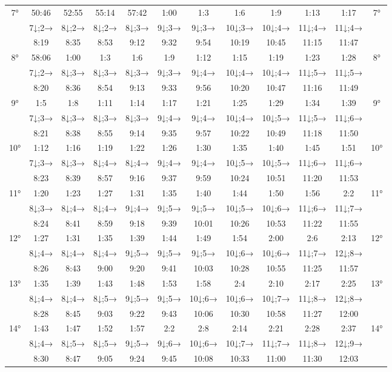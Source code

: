 \begin{scriptsize}
\begin{tabular}{c || c | c | c | c | c | c | c | c | c | c || c}
		\multirow{3}{*}{7°}&50:46&52:55&55:14&57:42&1:00&1:3&1:6&1:9&1:13&1:17&\multirow{3}{*}{7°}\\ \space&7↓;2→&8↓;2→&8↓;2→&8↓;3→&9↓;3→&9↓;3→&10↓;3→&10↓;4→&11↓;4→&11↓;4→&\space\\&8:19&8:35&8:53&9:12&9:32&9:54&10:19&10:45&11:15&11:47&\space\\\hline
		\multirow{3}{*}{8°}&58:06&1:00&1:3&1:6&1:9&1:12&1:15&1:19&1:23&1:28&\multirow{3}{*}{8°}\\ \space&7↓;2→&8↓;3→&8↓;3→&8↓;3→&9↓;3→&9↓;4→&10↓;4→&10↓;4→&11↓;5→&11↓;5→&\space\\&8:20&8:36&8:54&9:13&9:33&9:56&10:20&10:47&11:16&11:49&\space\\\hline
		\multirow{3}{*}{9°}&1:5&1:8&1:11&1:14&1:17&1:21&1:25&1:29&1:34&1:39&\multirow{3}{*}{9°}\\ \space&7↓;3→&8↓;3→&8↓;3→&8↓;3→&9↓;4→&9↓;4→&10↓;4→&10↓;5→&11↓;5→&11↓;6→&\space\\&8:21&8:38&8:55&9:14&9:35&9:57&10:22&10:49&11:18&11:50&\space\\\hline
		\multirow{3}{*}{10°}&1:12&1:16&1:19&1:22&1:26&1:30&1:35&1:40&1:45&1:51&\multirow{3}{*}{10°}\\ \space&7↓;3→&8↓;3→&8↓;4→&8↓;4→&9↓;4→&9↓;4→&10↓;5→&10↓;5→&11↓;6→&11↓;6→&\space\\&8:23&8:39&8:57&9:16&9:37&9:59&10:24&10:51&11:20&11:53&\space\\\hline
		\multirow{3}{*}{11°}&1:20&1:23&1:27&1:31&1:35&1:40&1:44&1:50&1:56&2:2&\multirow{3}{*}{11°}\\ \space&8↓;3→&8↓;4→&8↓;4→&9↓;4→&9↓;5→&9↓;5→&10↓;5→&10↓;6→&11↓;6→&11↓;7→&\space\\&8:24&8:41&8:59&9:18&9:39&10:01&10:26&10:53&11:22&11:55&\space\\\hline
		\multirow{3}{*}{12°}&1:27&1:31&1:35&1:39&1:44&1:49&1:54&2:00&2:6&2:13&\multirow{3}{*}{12°}\\ \space&8↓;4→&8↓;4→&8↓;4→&9↓;5→&9↓;5→&9↓;5→&10↓;6→&10↓;6→&11↓;7→&12↓;8→&\space\\&8:26&8:43&9:00&9:20&9:41&10:03&10:28&10:55&11:25&11:57&\space\\\hline
		\multirow{3}{*}{13°}&1:35&1:39&1:43&1:48&1:53&1:58&2:4&2:10&2:17&2:25&\multirow{3}{*}{13°}\\ \space&8↓;4→&8↓;4→&8↓;5→&9↓;5→&9↓;5→&10↓;6→&10↓;6→&10↓;7→&11↓;8→&12↓;8→&\space\\&8:28&8:45&9:03&9:22&9:43&10:06&10:30&10:58&11:27&12:00&\space\\\hline
		\multirow{3}{*}{14°}&1:43&1:47&1:52&1:57&2:2&2:8&2:14&2:21&2:28&2:37&\multirow{3}{*}{14°}\\ \space&8↓;4→&8↓;5→&8↓;5→&9↓;5→&9↓;6→&10↓;6→&10↓;7→&11↓;7→&11↓;8→&12↓;9→&\space\\&8:30&8:47&9:05&9:24&9:45&10:08&10:33&11:00&11:30&12:03&\space\\\hline

\end{tabular}
\end{scriptsize}
